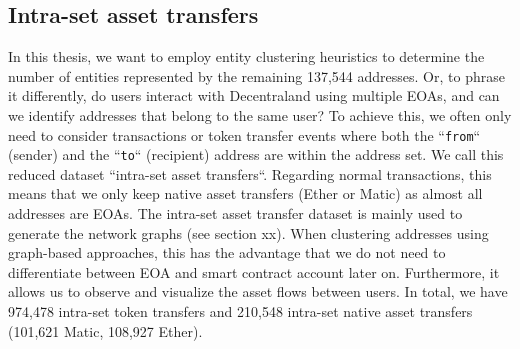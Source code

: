 \documentclass[12pt,a4paper,titlepage,oneside,english]{article}
\begin{document}
\subsection{Intra-set asset transfers}
\label{sec:intra-set}
In this thesis, we want to employ entity clustering heuristics to determine the number of entities represented by the remaining 137,544 addresses. Or, to phrase it differently, do users interact with Decentraland using multiple EOAs, and can we identify addresses that belong to the same user?
\newline
To achieve this, we often only need to consider transactions or token transfer events where both the ``\texttt{from}`` (sender) and the ``\texttt{to}`` (recipient) address are within the address set. We call this reduced dataset ``intra-set asset transfers``. Regarding normal transactions, this means that we only keep native asset transfers (Ether or Matic) as almost all addresses are EOAs. \newline
The intra-set asset transfer dataset is mainly used to generate the network graphs (see section xx). When clustering addresses using graph-based approaches, this has the advantage that we do not need to differentiate between EOA and smart contract account later on. Furthermore, it allows us to observe and visualize the asset flows between users. In total, we have 974,478 intra-set token transfers and 210,548 intra-set native asset transfers (101,621 Matic, 108,927 Ether).
\end{document}
